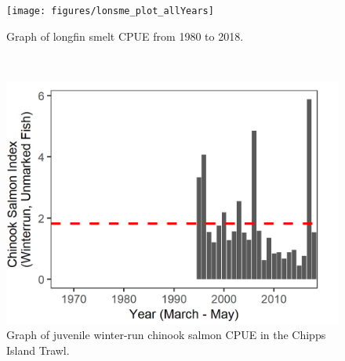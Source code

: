 \documentclass[
]{book}
\begin{document}
\begin{panel-grid}
\begin{columns-nocenter}
\begin{column40}
\end{column40}

\begin{column800}

\begin{expand}

\begin{figure}
\texttt{[image: figures/lonsme\_plot\_allYears]} \caption{Graph of longfin smelt CPUE from 1980 to 2018. }\label{fig:unnamed-chunk-174}
\end{figure}

\end{expand}

\end{column800}

\begin{column40}

~

\end{column40}

\begin{column800}

\begin{expand}

\begin{figure}
\includegraphics[width=15.25in]{figures/DJFMP_chinook_winterByLength_allyears} \caption{Graph of juvenile winter-run chinook salmon CPUE in the Chipps Island Trawl.}\label{fig:unnamed-chunk-175}
\end{figure}

\end{expand}

\end{column800}


\end{columns-nocenter}
\end{panel-grid}
\end{document}
